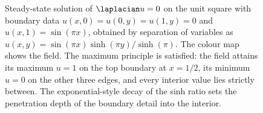 \begin{figure}[htbp]
\centering
{}
\caption[Laplace solution on a unit square]{Steady-state solution
of $\laplacian u = 0$ on the unit square with boundary data
$u(x,0) = u(0,y) = u(1,y) = 0$ and $u(x,1) = \sin(\pi x)$, obtained
by separation of variables as $u(x,y) = \sin(\pi x)\sinh(\pi
y)/\sinh(\pi)$. The colour map shows the field. The maximum
principle is satisfied: the field attains its maximum $u = 1$ on
the top boundary at $x = 1/2$, its minimum $u = 0$ on the other
three edges, and every interior value lies strictly between. The
exponential-style decay of the sinh ratio sets the penetration
depth of the boundary detail into the interior.}
\label{fig:vol02:ch12:laplace-square}
\end{figure}

